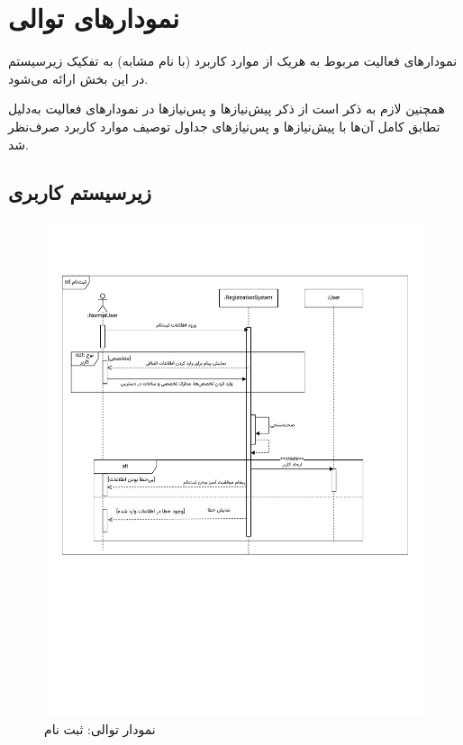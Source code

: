 \chapter{نمودارهای توالی}

نمودارهای فعالیت مربوط به هریک از موارد کاربرد (با نام مشابه) به تفکیک زیرسیستم در این بخش ارائه می‌شود.

همچنین لازم به ذکر است از ذکر پیش‌نیازها و پس‌نیازها در نمودارهای فعالیت به‌دلیل تطابق کامل آن‌ها با پیش‌نیاز‌ها و پس‌نیازهای جداول توصیف موارد کاربرد صرف‌نظر شد.
\newpage
\section{زیرسیستم کاربری}

\begin{figure}[ht!]
	\centering
	\includegraphics[scale=0.6, page=1]{figs/OOD-Sequence-1.pdf}
	\caption{نمودار توالی: ثبت نام}
\end{figure}
\FloatBarrier
\newpage

